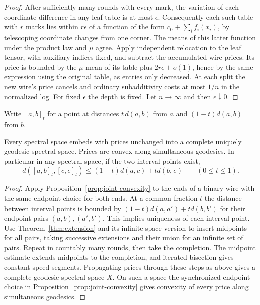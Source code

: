 \begin{proof}
After sufficiently many rounds with every mark, the variation of each
coordinate difference in any leaf table is at most $\epsilon$.
Consequently each such table with $r$ marks lies within $r\epsilon$
of a function of the form $c_0+\sum_i f_i(x_i)$, by telescoping
coordinate changes from one corner. The means of this latter function
under the product law and $\mu$ agree. Apply independent relocation to
the leaf tensor, with auxiliary indices fixed, and subtract the accumulated
wire prices. Its price is bounded by the $\mu$-mean of its table plus
$2r\epsilon+o(1)$, hence by the same expression using the original table,
as entries only decreased. At each split the new wire's price cancels
and ordinary subadditivity costs at most $1/n$ in the normalized log.
For fixed $\epsilon$ the depth is fixed. Let $n\to\infty$ and then
$\epsilon\downarrow0$.
\end{proof}


Write $[a,b]_t$ for a point at distances $t\,d(a,b)$ from $a$ and
$(1-t)d(a,b)$ from $b$.
\begin{corollary}\label{cor:spectral-geodesic}
Every spectral space embeds with prices unchanged into a complete uniquely geodesic spectral space.
Prices are convex along simultaneous geodesics. In particular in any spectral space,
if the two interval points exist,
\begin{equation}\label{eq:wire-busemann}
 d([a,b]_t,[c,e]_t)\le (1-t)d(a,c)+t d(b,e)
                       \qquad (0\le t\le1).
\end{equation}
\end{corollary}
\begin{proof}
Apply Proposition~\ref{prop:joint-convexity} to the ends of a binary
wire with the same endpoint choice for both ends. At a common fraction
$t$ the distance between interval points is bounded by
$(1-t)d(a,a')+t d(b,b')$ for their endpoint pairs $(a,b),(a',b')$.
This implies uniqueness of each interval point. Use
Theorem~\ref{thm:extension} and its infinite-space version to insert midpoints for all pairs, taking
successive extensions and their union for an infinite set of pairs.
Repeat in countably many rounds, then take the completion. The midpoint
estimate extends midpoints to the completion, and iterated bisection
gives constant-speed segments. Propagating prices through these steps as
above gives a complete geodesic spectral space $X$. On such a space
the synchronized endpoint choice in Proposition~\ref{prop:joint-convexity}
gives convexity of every price along simultaneous geodesics.
\end{proof}

